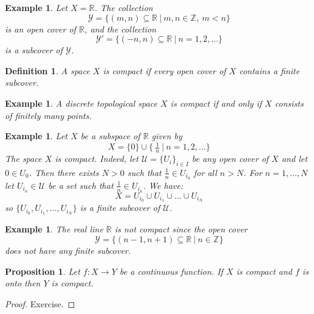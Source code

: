 \documentclass[11pt, letterpaper, oneside]{report}
\theoremstyle{pplain}
\newtheorem{proposition}[theorem]{Proposition}
\newtheorem{ITERMVALUE THM}[theorem]{Intermediate Value Theorem}
\newtheorem{HEINEBOREL THM}[theorem]{Heine-Borel Theorem}
\newtheorem{UMETR THM}[theorem]{Urysohn Metrization Theorem}
\newtheorem{UMETR2 THM}[theorem]{Urysohn Metrization Theorem (v.2)}
\theoremstyle{ddefinition}
\newtheorem{definition}[theorem]{Definition}
\newtheorem{example}[theorem]{Example}
\theoremstyle{nnn}
\newtheorem{TDA NN}[theorem]{Topological Data Analysis. }
\theoremstyle{eexercise}
\newcommand{\Z}{{\mathbb Z}}
\newcommand{\R}{{\mathbb R}}
\newcommand{\UU}{{\mathcal U}}
\newcommand{\YY}{{\mathcal Y}}
\begin{document}
\begin{example}
Let $X = \R$. The collection 
$$\YY = \{(m, n)\subseteq \R \ | \ m, n\in \Z, \ m< n \}$$
is an open cover of $\R$, and the collection 
$$\YY' = \{(-n, n) \subseteq \R\ | \ n= 1, 2, \dots  \}$$
is a subcover of $\YY$.  
\end{example}

\begin{definition}
A space $X$ is \emph{compact} if every open cover of $X$ contains a finite subcover. 
\end{definition}

\begin{example}
A discrete topological space $X$ is compact if and only if  $X$ consists of finitely many points. 
\end{example}


\begin{example}
Let $X$ be a subspace of $\R$ given by 
$$X = \{0 \} \cup \{\ \tfrac{1}{n} \ | \ n= 1, 2, \dots \}$$
The space $X$ is compact. Indeed, let $\UU = \{ U_{i} \}_{i\in I}$ be any open cover of $X$
and let $0\in U_{0}$. Then there exists $N>0$ such that $\frac{1}{n}\in U_{i_{0}}$ for all $n> N$. 
For $n=1, \dots, N$ let $U_{i_{n}}\in \UU$ be a set such that $\frac{1}{n}\in U_{i_{n}}$. We have:
$$X = U_{i_{0}} \cup U_{i_{1}} \cup \dots \cup U_{i_{N}}$$
so $\{U_{i_{0}}, U_{i_{1}}, \dots, U_{i_{N}}\}$ is a finite subcover of $\UU$.
\end{example}


\begin{example}
The real line $\R$ is not compact since the open cover 
$$\YY = \{(n-1, n+1) \subseteq \R \ | \ n\in \Z \}$$
does not have any finite subcover. 
\end{example}


\begin{proposition}
\label{COMPACT ONTO PROP}
Let $f\colon X\to Y$ be a continuous function. If  $X$ is compact and $f$ is onto then $Y$ is compact. 
\end{proposition}

\begin{proof}
Exercise.
\end{proof}
\end{document}
